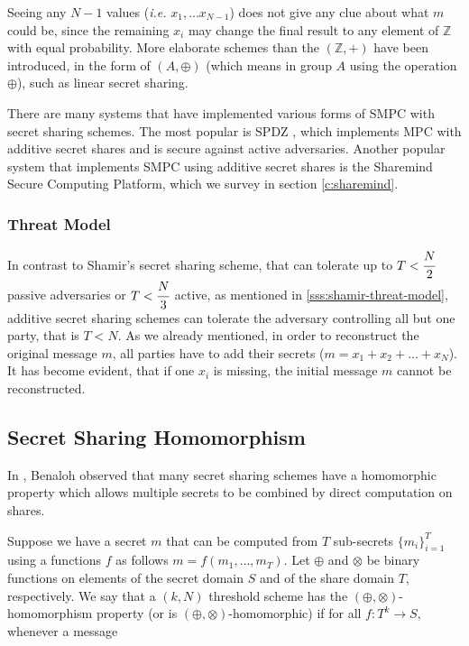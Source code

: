 Seeing any $N-1$ values (\textit{i.e.} $x_1, \dots x_{N-1}$) does not give any clue about what $m$ could be, since the remaining $x_i$ may change the final result to any element of $\mathbb{Z}$ with equal probability.
More elaborate schemes than the $(\mathbb{Z}, +)$ have been introduced, in the form of $(A, \oplus)$ (which means in group $A$ using the operation $\oplus$), such as linear secret sharing.

There are many systems that have implemented various forms of SMPC with secret sharing schemes.
The most popular is SPDZ \cite{damgaard2012multiparty, damgaard2013practical}, which implements MPC with additive secret shares and is secure against active adversaries.
Another popular system that implements SMPC using additive secret shares is the Sharemind Secure Computing Platform, which we survey in section \ref{c:sharemind}.


\subsubsection{Threat Model}\label{sss:additive-threat-model}
In contrast to Shamir's secret sharing scheme, that can tolerate up to $T < \cfrac{N}{2}$ passive adversaries or $T < \cfrac{N}{3}$ active, as mentioned in \ref{sss:shamir-threat-model}, additive secret sharing schemes can tolerate the adversary controlling all but one party, that is $T < N$.
As we already mentioned, in order to reconstruct the original message $m$, all parties have to add their secrets ($m = x_1 + x_2 + \dots + x_N$).
It has become evident, that if one $x_i$ is missing, the initial message $m$ cannot be reconstructed.



\subsection{Secret Sharing Homomorphism}\label{ss:secret-sharing-homomorphism}
In \cite{benaloh1986secret}, Benaloh observed that many secret sharing schemes have a homomorphic property which allows multiple secrets to be combined by direct computation on shares.

Suppose we have a secret $m$ that can be computed from $T$ sub-secrets $\{m_i\}^T_{i=1}$ using a functions $f$ as follows $m = f(m_1, \dots, m_T)$.
Let $\oplus$ and $\otimes$ be binary functions on elements of the secret domain $S$ and of the share domain $T$, respectively.
We say that a $(k, N)$ threshold scheme has the $(\oplus, \otimes)$-homomorphism property (or is $(\oplus, \otimes)$-homomorphic) if for all $f: T^k \rightarrow S$, whenever a message

